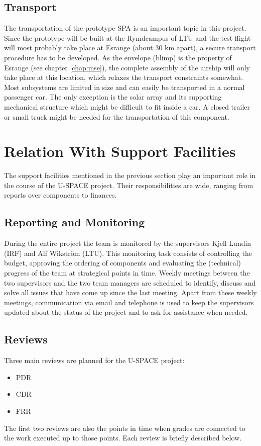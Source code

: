 \subsection{Transport}
%
The transportation of the prototype \ac{SPA} is an important topic in this project. Since the prototype will be built at the Rymdcampus of \ac{LTU} and the test flight will most probably take place at Esrange (about 30 km apart), a secure transport procedure has to be developed. As the envelope (blimp) is the property of Esrange (see chapter \ref{chap:mse}), the complete assembly of the airship will only take place at this location, which relaxes the transport constraints somewhat. Most subsystems are limited in size and can easily be  transported in a normal passenger car. The only exception is the solar array and its supporting mechanical structure which might be difficult to fit inside a car. A closed trailer or small truck might be needed for the transportation of this component.
%
\section{Relation With Support Facilities}
\label{sec:relation_support}
%
The support facilities mentioned in the previous section play an important role in the course of the \ac{U-SPACE} project. Their responsibilities are wide, ranging from reports over components to finances.
%
\subsection{Reporting and Monitoring}
%
During the entire project the team is monitored by the supervisors Kjell Lundin (\ac{IRF}) and Alf Wikström (\ac{LTU}). This monitoring task consists of controlling the budget, approving the ordering of components and evaluating the (technical) progress of the team at strategical points in time. Weekly meetings between the two supervisors and the two team managers are scheduled to identify, discuss and solve all issues that have come up since the last meeting. Apart from these weekly meetings, communication via email and telephone is used to keep the supervisors updated about the status of the project and to ask for assistance when needed.
%
\subsection{Reviews}
\label{subsec:reviews}
%
Three main reviews are planned for the \ac{U-SPACE} project:
%
\begin{itemize}
\item \acl{PDR}
\item \acl{CDR}
\item \acl{FRR}
\end{itemize}
%
The first two reviews are also the points in time when grades are connected to the work executed up to those points. Each review is briefly described below.
%

